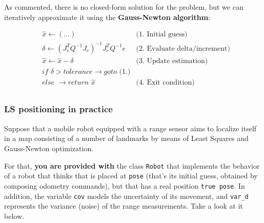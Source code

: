 \documentclass[11pt]{article}
\begin{document}
As commented, there is no closed-form solution for the problem, but we
can iteratively approximate it using the \textbf{Gauss-Newton
algorithm}:

\[
  \begin{aligned}
      &\hat{x} \leftarrow (\dots)  &\text{(1. Initial guess)} \\
      &\delta \leftarrow (J_e^T Q^{-1} J_e)^{-1} J_e^T  Q^{-1} e  &\text{(2. Evaluate delta/increment)} \\
      &\hat{x} \leftarrow \hat{x} - \delta &\text{(3. Update estimation)} \\
      &\textit{if }\delta > \textit{tolerance} \rightarrow \textit{goto (1.)} \\
      &\textit{else } \rightarrow \textit{return }\hat{x} &\text{(4. Exit condition)}\\
  \end{aligned}
  \]

    \hypertarget{ls-positioning-in-practice}{%
\subsubsection{LS positioning in
practice}\label{ls-positioning-in-practice}}

Suppose that a mobile robot equipped with a range sensor aims to
localize itself in a map consisting of a number of landmarks by means of
Least Squares and Gauss-Newton optimization.

For that, \textbf{you are provided with} the class \texttt{Robot} that
implements the behavior of a robot that thinks that is placed at
\texttt{pose} (that's its initial guess, obtained by composing odometry
commands), but that has a real position \texttt{true\ pose}. In
addition, the variable \texttt{cov} models the uncertainty of its
movement, and \texttt{var\_d} represents the variance (noise) of the
range measurements. Take a look at it below.
\end{document}

